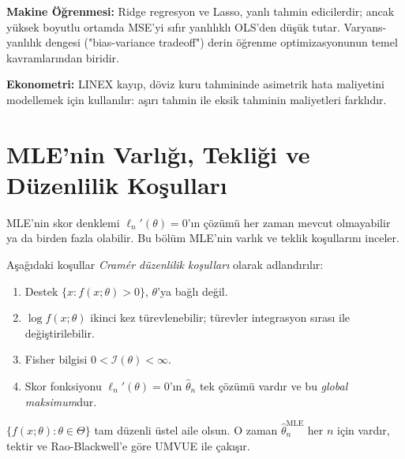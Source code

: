 \begin{disiplinlerarasibaglan}
\textbf{Makine Öğrenmesi:} Ridge regresyon ve Lasso, yanlı tahmin edicilerdir; ancak yüksek boyutlu ortamda MSE'yi sıfır yanlılıklı OLS'den düşük tutar. Varyans-yanlılık dengesi ("bias-variance tradeoff") derin öğrenme optimizasyonunun temel kavramlarından biridir.

\textbf{Ekonometri:} LINEX kayıp, döviz kuru tahmininde asimetrik hata maliyetini modellemek için kullanılır: aşırı tahmin ile eksik tahminin maliyetleri farklıdır.
\end{disiplinlerarasibaglan}

\section{MLE'nin Varlığı, Tekliği ve Düzenlilik Koşulları}
\label{sec:mle_duzenlilk}

\begin{motivasyon}
MLE'nin skor denklemi $\ell_n'(\theta)=0$'ın çözümü her zaman mevcut olmayabilir ya da birden fazla olabilir. Bu bölüm MLE'nin varlık ve teklik koşullarını inceler.
\end{motivasyon}

\begin{tanim}\label{def:duzenlilik}
Aşağıdaki koşullar \emph{Cramér düzenlilik koşulları} olarak adlandırılır:
\begin{enumerate}
  \item[(R1)] Destek $\{x:f(x;\theta)>0\}$, $\theta$'ya bağlı değil.
  \item[(R2)] $\log f(x;\theta)$ ikinci kez türevlenebilir; türevler integrasyon sırası ile değiştirilebilir.
  \item[(R3)] Fisher bilgisi $0<\mathcal{I}(\theta)<\infty$.
  \item[(R4)] Skor fonksiyonu $\ell_n'(\theta)=0$'ın $\hat\theta_n$ tek çözümü vardır ve bu \emph{global maksimum}dur.
\end{enumerate}
\end{tanim}

\begin{teorem}\label{thm:mle_teklik}
$\{f(x;\theta):\theta\in\Theta\}$ tam düzenli üstel aile olsun. O zaman $\hat\theta_n^{\mathrm{MLE}}$ her $n$ için vardır, tektir ve Rao-Blackwell'e göre UMVUE ile çakışır.
\end{teorem}

